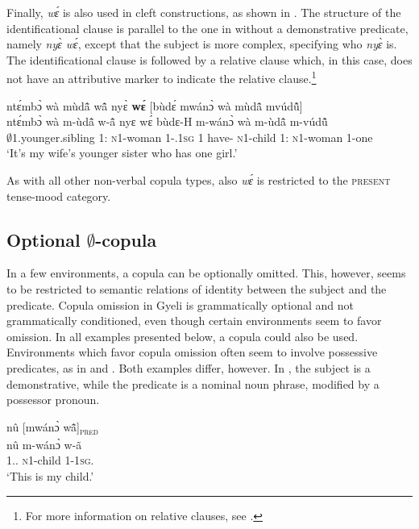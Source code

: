 Finally, {\itshape wɛ́} is also used in cleft constructions, as shown in . The structure of the identificational clause is parallel to the one in  without a demonstrative predicate, namely {\itshape nyɛ̀ wɛ́}, except that the subject is more complex, specifying who {\itshape nyɛ̀} is. The identificational clause is  followed by a relative clause which, in this case, does not have an attributive marker to indicate the relative clause.\footnote{For more information on relative clauses, see .}


\ea \label{we7}
  \glll ntɛ́mbɔ̀ wà mùdã̂ wã̂ nyɛ̀ {\bfseries wɛ́} [bùdɛ́ mwánɔ̀ wà mùdã̂ mvúdũ̂]\textsubscript{\REL} \\
       ntɛ́mbɔ̀ wà m-ùdã̂ w-ã̂ nyɛ wɛ́ {\db}bùdɛ-H m-wánɔ̀ wà m-ùdã̂ m-vúdũ̂ \\
        $\emptyset$1.younger.sibling 1:{\ATT} \textsc{n}1-woman 1-{\POSS}.1\textsc{sg} 1 {\ID} {\db}have-{\R} \textsc{n}1-child 1:{\ATT} \textsc{n}1-woman 1-one\\
    \trans `It's my wife's younger sister who has one girl.'
\z

\noindent As with all other non-verbal copula types, also {\itshape wɛ́} is restricted to the \textsc{present} tense-mood category.



\subsection{Optional $\emptyset$-copula}
\label{sec:0COP}

In a few environments, a copula can be optionally omitted. This, however, seems to be restricted to semantic relations of identity between the subject and the predicate. Copula omission in Gyeli is grammatically optional and not grammatically conditioned, even though certain environments seem to favor omission. In all examples presented below, a copula could also be used. Environments which favor copula omission often seem to involve possessive predicates, as in  and . Both examples differ, however. In , the subject is a demonstrative, while the predicate is a nominal noun phrase, modified by a possessor pronoun.




\ea\label{0COP1}
  \glll     nû [mwánɔ̀ wã̂]\textsubscript{\textsc{pred}}  \\
             nû {\db}m-wánɔ̀ w-ã \\
               1.{\DEM}.{\PROX} {\db}\textsc{n}1-child 1-1\textsc{sg}.{\POSS}  \\
    \trans `This is my child.'
\z

